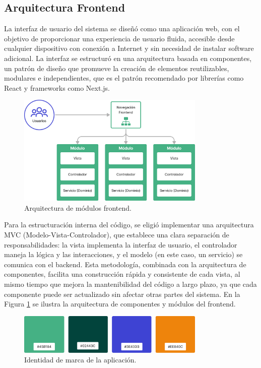 \subsection{Arquitectura Frontend}

La interfaz de usuario del sistema se diseñó como una aplicación web, con el objetivo de proporcionar una experiencia de usuario fluida, accesible desde cualquier dispositivo con conexión a Internet y sin necesidad de instalar software adicional. La interfaz se estructuró en una arquitectura basada en componentes, un patrón de diseño que promueve la creación de elementos reutilizables, modulares e independientes, que es el patrón recomendado por librerías como React y frameworks como Next.js.

\begin{figure}[!htb]
\centering
\includegraphics[width=0.8\textwidth]{Figures/frontend-architecture.png}
\caption{Arquitectura de módulos frontend.}
\label{fig:frontend-architecture}
\end{figure}

Para la estructuración interna del código, se eligió implementar una arquitectura MVC (Modelo-Vista-Controlador), que establece una clara separación de responsabilidades: la vista implementa la interfaz de usuario, el controlador maneja la lógica y las interacciones, y el modelo (en este caso, un servicio) se comunica con el backend. Esta metodología, combinada con la arquitectura de componentes, facilita una construcción rápida y consistente de cada vista, al mismo tiempo que mejora la mantenibilidad del código a largo plazo, ya que cada componente puede ser actualizado sin afectar otras partes del sistema. En la Figura \ref{fig:frontend-architecture} se ilustra la arquitectura de componentes y módulos del frontend.

\begin{figure}[!htb]
\centering
\includegraphics[width=0.8\textwidth]{Figures/frontend-palette.png}
\caption{Identidad de marca de la aplicación.}
\label{fig:frontend-brand}
\end{figure}

